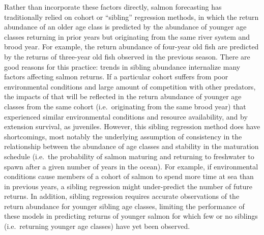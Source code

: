 \documentclass[
]{article}
\begin{document}
Rather than incorporate these factors directly, salmon forecasting has traditionally relied on cohort or ``sibling'' regression methods, in which the return abundance of an older age class is predicted by the abundance of younger age classes returning in prior years but originating from the same river system and brood year. For example, the return abundance of four-year old fish are predicted by the returns of three-year old fish observed in the previous season. There are good reasons for this practice: trends in sibling abundance internalize many factors affecting salmon returns. If a particular cohort suffers from poor environmental conditions and large amount of competition with other predators, the impacts of that will be reflected in the return abundance of younger age classes from the same cohort (i.e.~originating from the same brood year) that experienced similar environmental conditions and resource availability, and by extension survival, as juveniles. However, this sibling regression method does have shortcomings, most notably the underlying assumption of consistency in the relationship between the abundance of age classes and stability in the maturation schedule (i.e.~the probability of salmon maturing and returning to freshwater to spawn after a given number of years in the ocean). For example, if environmental conditions cause members of a cohort of salmon to spend more time at sea than in previous years, a sibling regression might under-predict the number of future returns. In addition, sibling regression requires accurate observations of the return abundance for younger sibling age classes, limiting the performance of these models in predicting returns of younger salmon for which few or no siblings (i.e.~returning younger age classes) have yet been observed.
\end{document}
